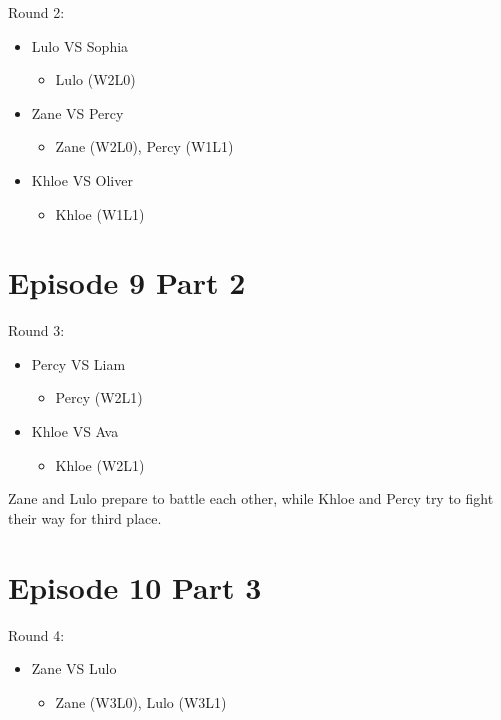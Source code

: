 \par \noindent Round 2: 

\begin{itemize}
   \item Lulo VS Sophia
   \begin{itemize}
      \item Lulo (W2L0)
   \end{itemize}
   \item Zane VS Percy
   \begin{itemize}
      \item Zane (W2L0), Percy (W1L1)
   \end{itemize}
   \item Khloe VS Oliver
   \begin{itemize}
      \item Khloe (W1L1)
   \end{itemize}
\end{itemize}

\section{Episode 9 Part 2}

\par \noindent Round 3:
\begin{itemize}
   \item Percy VS Liam
   \begin{itemize}
      \item Percy (W2L1)
   \end{itemize}
   \item Khloe VS Ava
   \begin{itemize}
      \item Khloe (W2L1)
   \end{itemize}
\end{itemize}

\par \noindent Zane and Lulo prepare to battle each other, while Khloe and Percy try to fight their way for third place.

\newpage

\section{Episode 10 Part 3}
\par \noindent Round 4:
\begin{itemize}
   \item Zane VS Lulo
   \begin{itemize}
      \item Zane (W3L0), Lulo (W3L1)
   \end{itemize}
\end{itemize}
    
